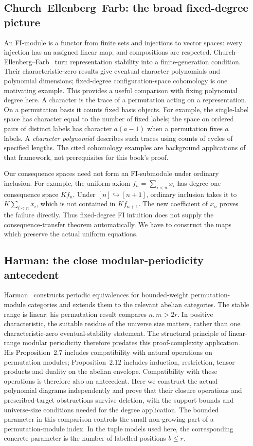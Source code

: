 \documentclass[11pt,a4paper,oneside,openany]{book}
\theoremstyle{definition}\newtheorem{definition}[theorem]{Definition}
\theoremstyle{remark}\newtheorem{remark}[theorem]{Remark}
\numberwithin{equation}{chapter}
\begin{document}
\subsection{Church--Ellenberg--Farb: the broad fixed-degree picture}
An FI-module is a functor from finite sets and injections to vector
spaces: every injection has an assigned linear map, and compositions
are respected. Church--Ellenberg--Farb~\cite{CEF} turn representation
stability into a finite-generation condition. Their characteristic-zero
results give eventual character polynomials and polynomial dimensions;
fixed-degree configuration-space cohomology is one motivating example.
This provides a useful comparison with fixing polynomial degree here.
A character is the trace of a permutation acting on a representation.
On a permutation basis it counts fixed basis objects. For example,
the single-label space has character equal to the number of fixed
labels; the space on ordered pairs of distinct labels has character
$a(a-1)$ when a
permutation fixes $a$ labels. A \emph{character polynomial} describes
such traces using counts of cycles of specified lengths.
The cited cohomology examples are background applications of that
framework, not prerequisites for this book's proof.

Our consequence spaces need not form an FI-submodule under ordinary
inclusion. For example, the uniform axiom $f_n=\sum_{i<n}x_i$ has
degree-one consequence space $Kf_n$. Under $[n]\hookrightarrow[n+1]$,
ordinary inclusion takes it to $K\sum_{i<n}x_i$, which is not contained
in $Kf_{n+1}$. The new coefficient of $x_n$ proves the failure directly.
Thus fixed-degree FI intuition does not supply the consequence-transfer
theorem automatically. We have to construct the maps which preserve
the actual uniform equations.

\subsection{Harman: the close modular-periodicity antecedent}
Harman~\cite[Theorem 2.5 and Corollary 2.11]{Harman} constructs
periodic equivalences for bounded-weight permutation-module categories
and extends them to the relevant abelian categories. The stable range
is linear: his permutation result compares $n,m>2r$. In positive
characteristic, the suitable residue of the universe size matters, rather than
one characteristic-zero eventual-stability statement.
The structural principle of linear-range modular periodicity therefore
predates this proof-complexity application.
His Proposition~2.7 includes compatibility with natural operations on
permutation modules; Proposition~2.12 includes induction, restriction,
tensor products and duality on the abelian envelope. Compatibility with
these operations is therefore also an antecedent. Here we construct
the actual polynomial diagrams independently and prove that their
closure operations and prescribed-target obstructions survive deletion,
with the support bounds and universe-size conditions needed for the degree application.
The bounded parameter in this comparison controls the small
non-growing part of a permutation-module index. In the tuple
models used here, the corresponding concrete parameter is the
number of labelled positions $b\le r$.
\end{document}
